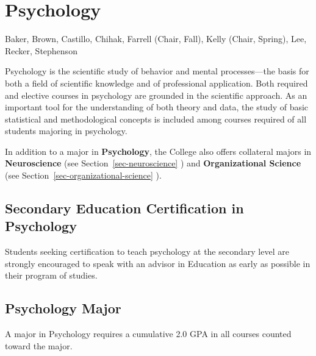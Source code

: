 \documentclass[
  letterpaper,
]{scrbook}
\begin{document}
\section{Psychology}\label{sec-psychology}

Baker, Brown, Castillo, Chihak, Farrell (Chair, Fall), Kelly (Chair,
Spring), Lee, Recker, Stephenson

Psychology is the scientific study of behavior and mental
processes---the basis for both a field of scientific knowledge and of
professional application. Both required and elective courses in
psychology are grounded in the scientific approach. As an important tool
for the understanding of both theory and data, the study of basic
statistical and methodological concepts is included among courses
required of all students majoring in psychology.

In addition to a major in \textbf{Psychology}, the College also offers
collateral majors in \textbf{Neuroscience} (see
Section~\ref{sec-neuroscience} ) and \textbf{Organizational Science}
(see Section~\ref{sec-organizational-science} ).

\subsection{Secondary Education Certification in
Psychology}\label{secondary-education-certification-in-psychology}

Students seeking certification to teach psychology at the secondary
level are strongly encouraged to speak with an advisor in Education as
early as possible in their program of studies.

\subsection{Psychology Major}\label{psychology-major}

A major in Psychology requires a cumulative 2.0 GPA in all courses
counted toward the major.
\end{document}
